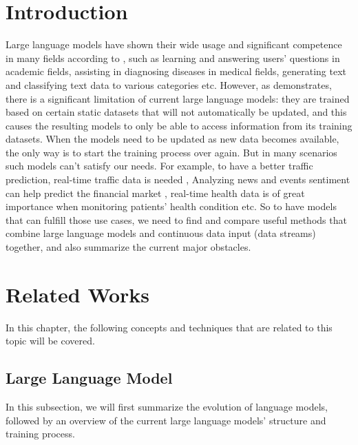 \documentclass[runningheads]{llncs}
\begin{document}
\section{Introduction}
Large language models have shown their wide usage and significant competence in many fields according to \cite{Liu23}, such as learning and answering users' questions in academic fields,
assisting in diagnosing diseases in medical fields, generating text and classifying text data to various categories etc. However, as \cite{Gupta23} demonstrates, 
there is a significant limitation of current large language models: they are trained based on certain static datasets that will not automatically be updated, and this causes the resulting models to only be able to access information from its training datasets. 
When the models need to be updated as new data becomes available, the only way is to start the training process over again. But in many scenarios such models can't satisfy our needs. 
For example, to have a better traffic prediction, real-time traffic data is needed \cite{Zhang24},
Analyzing news and events sentiment can help predict the financial market \cite{Araci19}, 
real-time health data is of great importance when monitoring patients' health condition \cite{Thiru23} etc.
So to have models that can fulfill those use cases, we need to find and compare useful methods that combine large language models and continuous data input (data streams) together, and also summarize the current major obstacles. 

\section{Related Works}
In this chapter, the following concepts and techniques that are related to this topic will be covered.

\subsection{Large Language Model}
In this subsection, we will first summarize the evolution of language models, followed by an overview of the current large language
models' structure and training process.    
  
\end{document}
